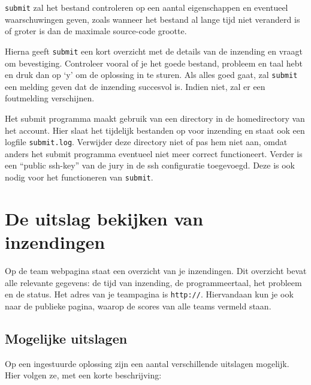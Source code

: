 \documentclass[11pt,a4paper]{article}
\newcommand{\url}[1]{\texttt{#1}}
\begin{document}
\texttt{submit} zal het bestand controleren op een aantal eigenschappen
en eventueel waarschuwingen geven, zoals wanneer het bestand al lange
tijd niet veranderd is of groter is dan de maximale source-code grootte.

Hierna geeft \texttt{submit} een kort overzicht met de details van de
inzending en vraagt om bevestiging. Controleer vooral of je het goede
bestand, probleem en taal hebt en druk dan op `y' om de oplossing in
te sturen. Als alles goed gaat, zal \texttt{submit} een melding geven
dat de inzending succesvol is. Indien niet, zal er een foutmelding
verschijnen.

Het submit programma maakt gebruik van een directory \texttt{\USERSUBMITDIR}
in de homedirectory van het account. Hier slaat het tijdelijk
bestanden op voor inzending en staat ook een logfile \texttt{submit.log}.
Verwijder deze directory niet of pas hem niet aan, omdat anders het
submit programma eventueel niet meer correct functioneert. Verder
is een ``public ssh-key'' van de jury in de ssh configuratie
toegevoegd. Deze is ook nodig voor het functioneren van \texttt{submit}.
 
\section{De uitslag bekijken van inzendingen}

Op de team webpagina staat een overzicht van je inzendingen.
Dit overzicht bevat alle relevante gegevens: de tijd van inzending, de
programmeertaal, het probleem en de status. Het adres van je
teampagina is \url{http://\WEBSERVER}. Hiervandaan kun je ook naar
de publieke pagina, waarop de scores van alle teams vermeld staan.

\subsection{Mogelijke uitslagen}

Op een ingestuurde oplossing zijn een aantal verschillende uitslagen
mogelijk. Hier volgen ze, met een korte beschrijving:
\end{document}

